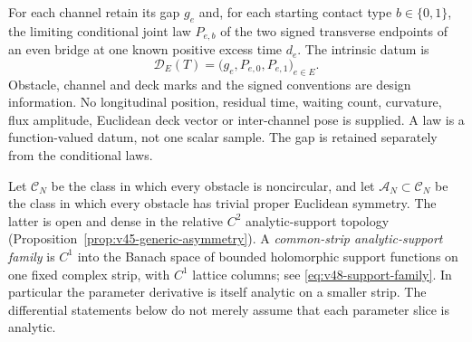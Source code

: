 For each channel retain its gap $g_e$ and, for each starting contact type
$b\in\{0,1\}$, the limiting conditional joint law $P_{e,b}$ of the two
signed transverse endpoints of an even bridge at one known positive
excess time $d_e$.  The intrinsic datum is
\begin{equation}\label{eq:v48-datum}
       \mathcal D_E(T)=\bigl(g_e,P_{e,0},P_{e,1}\bigr)_{e\in E}.
\end{equation}
Obstacle, channel and deck marks and the signed conventions are design
information.  No longitudinal position, residual time, waiting count,
curvature, flux amplitude, Euclidean deck vector or inter-channel pose
is supplied.  A law is a function-valued datum, not one scalar sample.
The gap is retained separately from the conditional laws.

Let $\mathscr C_N$ be the class in which every obstacle is noncircular,
and let $\mathscr A_N\subset\mathscr C_N$ be the class in which every
obstacle has trivial proper Euclidean symmetry.  The latter is open and
dense in the relative $C^2$ analytic-support topology
(Proposition~\ref{prop:v45-generic-asymmetry}).  A
\emph{common-strip analytic-support family} is $C^1$ into the Banach space
of bounded holomorphic support functions on one fixed complex strip,
with $C^1$ lattice columns; see \eqref{eq:v48-support-family}.
In particular the parameter derivative is itself analytic on a smaller
strip.  The differential statements below do not merely assume that
each parameter slice is analytic.

